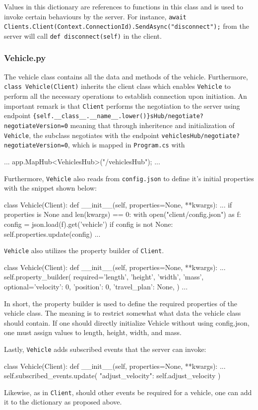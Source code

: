 Values in this dictionary are references to functions in this class and is used to invoke certain behaviours by the server. For instance, \newline\verb|await Clients.Client(Context.ConnectionId).SendAsync("disconnect");| from the server will call \verb|def disconnect(self)| in the client. 

\subsubsection{Vehicle.py}
The vehicle class contains all the data and methods of the vehicle. Furthermore, \verb|class Vehicle(Client)| inherits the client class which enables \verb|Vehicle| to perform all the necessary operations to establish connection upon initiation. An important remark is that \verb|Client| performs the negotiation to the server using endpoint \newline \verb|{self.__class__.__name__.lower()}sHub/negotiate?negotiateVersion=0| meaning that through inheritence and initialization of \verb|Vehicle|, the subclass negotiates with the endpoint  \verb|vehiclesHub/negotiate?negotiateVersion=0|, which is mapped in \verb|Program.cs| with
\begin{csharp}
...
app.MapHub<VehiclesHub>("/vehiclesHub");
...
\end{csharp}

Furthermore, \verb|Vehicle| also reads from \verb|config.json| to define it's initial properties with the snippet shown below:
\begin{python}
class Vehicle(Client):
	def __init__(self, properties=None, **kwargs):
		...
		if properties is None and len(kwargs) == 0:
			with open("client/config.json") as f:
				config = json.load(f).get('vehicle')
				if config is not None:
					self.properties.update(config)
		...
\end{python}

\verb|Vehicle| also utilizes the property builder of \verb|Client|.

\begin{python}
class Vehicle(Client):
	def __init__(self, properties=None, **kwargs):
		...
		self.property_builder(
			required={'length', 'height', 'width', 'mass'},
			optional={'velocity': 0, 'position': 0, 'travel_plan': None},
		)
		...
\end{python}

In short, the property builder is used to define the required properties of the vehicle class. The meaning is to restrict somewhat what data the vehicle class should contain. If one should directly initialize Vehicle without using config.json, one must assign values to length, height, width, and mass.

Lastly, \verb|Vehicle| adds subscribed events that the server can invoke:
\begin{python}
class Vehicle(Client):
	def __init__(self, properties=None, **kwargs):
		...
		self.subscribed_events.update({
			"adjust_velocity": self.adjust_velocity
		})
\end{python}

Likewise, as in \verb|Client|, should other events be required for a vehicle, one can add it to the dictionary as proposed above.